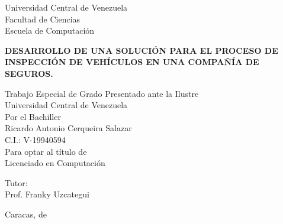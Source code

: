 \begin{center}
	Universidad Central de Venezuela\\
	Facultad de Ciencias\\
	Escuela de Computación\\
	
\end{center}

\vspace{2.5cm}
\begin{center}
	\large{\textbf{ DESARROLLO DE UNA SOLUCIÓN PARA EL PROCESO DE INSPECCIÓN DE VEHÍCULOS EN UNA COMPAÑÍA DE SEGUROS. }}
\end{center}

\vspace{5.0cm}
\begin{center}
	Trabajo Especial de Grado Presentado ante la Ilustre\\
	Universidad Central de Venezuela\\
	Por el Bachiller\\
	Ricardo Antonio Cerqueira Salazar\\
	C.I.: V-19940594\\
	Para optar al título de \\
    Licenciado en Computación \\
\end{center}

\begin{center}
	Tutor:\\ Prof. Franky Uzcategui\\
\end{center}

\vspace{1.0cm}
\begin{center}
	Caracas, \monthname[\month] de \the\year
\end{center}
